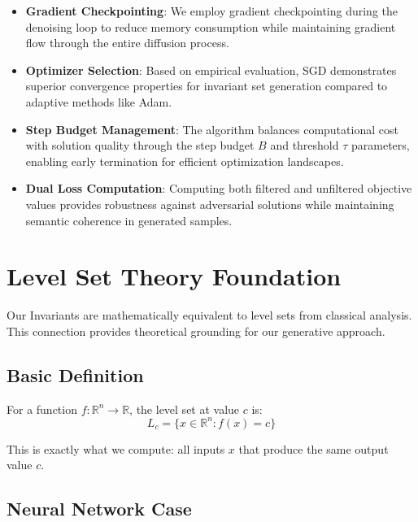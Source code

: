 \documentclass[licencjacka,en]{pracamgr}
\newcommand{\framework}[1]{Invariants}  %
\begin{document}
\begin{itemize}
    \item \textbf{Gradient Checkpointing}: We employ gradient checkpointing during the denoising loop to reduce memory consumption while maintaining gradient flow through the entire diffusion process.
    
    \item \textbf{Optimizer Selection}: Based on empirical evaluation, SGD demonstrates superior convergence properties for invariant set generation compared to adaptive methods like Adam.
    
    \item \textbf{Step Budget Management}: The algorithm balances computational cost with solution quality through the step budget $B$ and threshold $\tau$ parameters, enabling early termination for efficient optimization landscapes.
    
    \item \textbf{Dual Loss Computation}: Computing both filtered and unfiltered objective values provides robustness against adversarial solutions while maintaining semantic coherence in generated samples.
\end{itemize}

\section{Level Set Theory Foundation}\label{appendix:level_sets}

Our \framework{} are mathematically equivalent to level sets from classical analysis. This connection provides theoretical grounding for our generative approach.

\subsection{Basic Definition}

For a function $f: \mathbb{R}^n \rightarrow \mathbb{R}$, the level set at value $c$ is:
\begin{equation}
L_c = \{x \in \mathbb{R}^n : f(x) = c\}
\end{equation}

This is exactly what we compute: all inputs $x$ that produce the same output value $c$.

\subsection{Neural Network Case}
\end{document}
